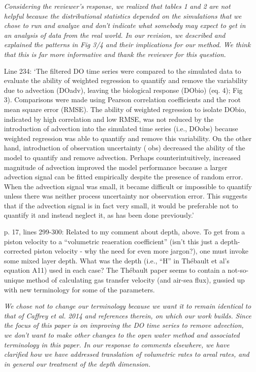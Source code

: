 \documentclass[letterpaper,12pt]{article}\usepackage[]{graphicx}\usepackage[]{color}
\begin{document}
{\it Considering the reviewer’s response, we realized that tables 1 and 2 are not helpful because the distributional statistics depended on the simulations that we chose to run and analyze and don’t indicate what somebody may expect to get in an analysis of data from the real world.  In our revision, we described and explained the patterns in Fig 3/4 and their implications for our method.  We think that this is far more informative and thank the reviewer for this question.

Line 234: `The filtered DO time series were compared to the simulated data to evaluate the ability of weighted regression to quantify and remove the variability due to advection (DOadv), leaving the biological response (DObio) (eq. 4); Fig 3).  Comparisons were made using Pearson correlation coefficients and the root mean square error (RMSE).  The ability of weighted regression to isolate DObio, indicated by high correlation and low RMSE, was not reduced by the introduction of advection into the simulated time series (i.e., DOobs) because weighted regression was able to quantify and remove this variability.  On the other hand, introduction of observation uncertainty (obs) decreased the ability of the model to quantify and remove advection.  Perhaps counterintuitively, increased magnitude of advection improved the model performance because a larger advection signal can be fitted empirically despite the presence of random error.  When the advection signal was small, it became difficult or impossible to quantify unless there was neither process uncertainty nor observation error.  This suggests that if the advection signal is in fact very small, it would be preferable not to quantify it and instead neglect it, as has been done previously.' 
}

p. 17, lines 299-300: Related to my comment about depth, above. To get from a piston velocity
to a “volumetric reaeration coefficient” (isn’t this just a depth-corrected piston velocity - why the need for even more jargon?), one must invoke some mixed layer depth. What was the depth (i.e., “H” in Thébault et al’s equation A11) used in each case? The Thébault paper seems to contain a not-so-unique method of calculating gas transfer velocity (and air-sea flux), gussied up with new terminology for some of the parameters.

{\it We chose not to change our terminology because we want it to remain identical to that of Caffrey et al. 2014 and references therein, on which our work builds.  Since the focus of this paper is on improving the DO time series to remove advection, we don’t want to make other changes to the open water method and associated terminology in this paper.  In our response to comments elsewhere, we have clarified how we have addressed translation of volumetric rates to areal rates, and in general our treatment of the depth dimension.}
\end{document}
